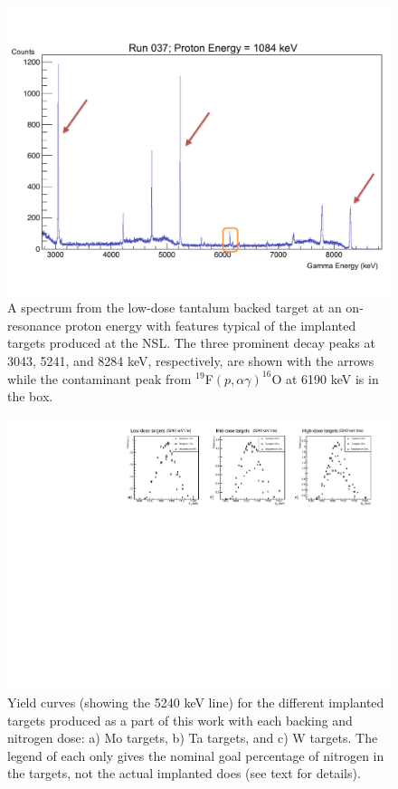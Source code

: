 \begin{figure}
\includegraphics[width=\linewidth]{figures/typicalSpectrum.pdf}
\caption{A spectrum from the low-dose tantalum backed target at an on-resonance proton energy with features typical of the implanted targets produced at the NSL. The three prominent decay peaks at 3043, 5241, and 8284 keV, respectively, are shown with the arrows while the contaminant peak from $^{19}$F$\left( p, \alpha\gamma \right)^{16}$O at 6190 keV is in the box.  }
\label{fig: implantedSpectrum}
\end{figure}


\begin{figure}
\includegraphics[width=\linewidth]{figures/comparePercentageBW.pdf}
\caption{Yield curves (showing the 5240 keV line) for the different implanted targets produced as a part of this work with each backing and nitrogen dose: a) Mo targets, b) Ta targets, and c) W targets. The legend of each only gives the nominal goal percentage of nitrogen in the targets, not the actual implanted does (see text for details).}
\label{fig: yieldCurves}
\end{figure}


